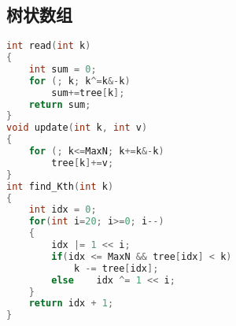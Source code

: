 \subsection{树状数组}
    \begin{lstlisting}[language=c++]
int read(int k)
{
    int sum = 0;
    for (; k; k^=k&-k)
        sum+=tree[k];
    return sum;
}
void update(int k, int v)
{
    for (; k<=MaxN; k+=k&-k)
        tree[k]+=v;
}
int find_Kth(int k)
{
    int idx = 0;
    for(int i=20; i>=0; i--)
    {
        idx |= 1 << i;
        if(idx <= MaxN && tree[idx] < k)
            k -= tree[idx];
        else	idx ^= 1 << i;
    }
    return idx + 1;
}
    \end{lstlisting}
